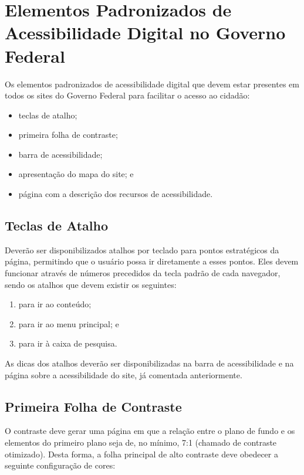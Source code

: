 \documentclass[
  12pt,
  openright,
  twoside,
  a4paper,
  english,
  french,
  spanish,
  brazil
]{abntex2}
\begin{document}
\section{Elementos Padronizados de Acessibilidade Digital no Governo Federal}

Os elementos padronizados de acessibilidade digital que devem estar presentes em
todos os sites do Governo Federal para facilitar o acesso ao cidadão:

\begin{itemize}
  \item teclas de atalho;
  \item primeira folha de contraste;
  \item barra de acessibilidade;
  \item apresentação do mapa do site; e
  \item página com a descrição dos recursos de acessibilidade.
\end{itemize}

\subsection{Teclas de Atalho}

Deverão ser disponibilizados atalhos por teclado para pontos estratégicos da
página, permitindo que o usuário possa ir diretamente a esses pontos. Eles devem
funcionar através de números precedidos da tecla padrão de cada navegador, sendo
os atalhos que devem existir os seguintes:

\begin{enumerate}
  \item para ir ao conteúdo;
  \item para ir ao menu principal; e
  \item para ir à caixa de pesquisa.
\end{enumerate}

As dicas dos atalhos deverão ser disponibilizadas na barra de acessibilidade e
na página sobre a acessibilidade do site, já comentada anteriormente.

\subsection{Primeira Folha de Contraste}

O contraste deve gerar uma página em que a relação entre o plano de fundo e os
elementos do primeiro plano seja de, no mínimo, 7:1 (chamado de contraste
otimizado). Desta forma, a folha principal de alto contraste deve obedecer a
seguinte configuração de cores:
\end{document}
